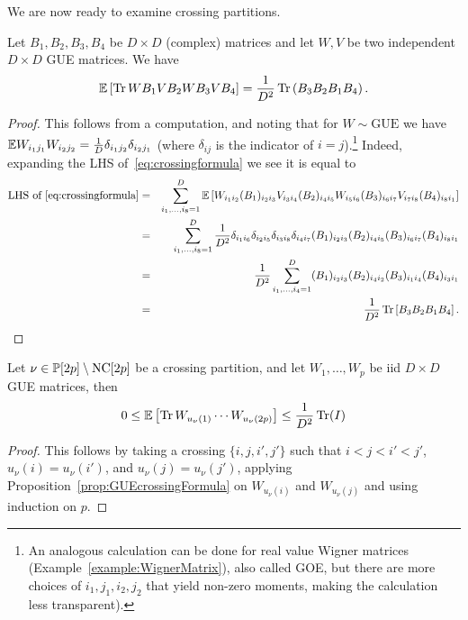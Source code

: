 We are now ready to examine crossing partitions.

\begin{proposition}\label{prop:GUEcrossingFormula}
Let $B_1,B_2,B_3,B_4$ be $D\times D$ (complex) matrices and let $W,V$ be two independent $D\times D$ GUE matrices. We have
\begin{equation}\label{eq:crossingformula}
\mathbb{E}\left[ \operatorname{Tr} W B_1 V B_2 W B_3 V B_4 \right] = \frac{1}{D^2} \operatorname{Tr}\left( B_3B_2B_1B_4 \right).
\end{equation}
\end{proposition}
\begin{proof}
This follows from a computation, and noting that for $W\sim\mathrm{GUE}$ we have $
\mathbb{E} W_{i_1j_1}W_{i_2j_2} = \frac1{D}\delta_{i_1j_2}\delta_{i_2j_1}$ (where $\delta_{ij}$ is the indicator of $i=j$).\footnote{An analogous  calculation can be done for real value Wigner matrices (Example~\ref{example:WignerMatrix}), also called GOE, but there are more choices of $i_1,j_1,i_2,j_2$ that yield non-zero moments, making the calculation less transparent).} Indeed, expanding the LHS of~\eqref{eq:crossingformula} we see it is equal to
\begin{eqnarray*}
\mathrm{LHS}\text{ of }\eqref{eq:crossingformula} & = & \sum_{i_1,\dots,i_8=1}^D \mathbb{E}\left[W_{i_1i_2} (B_1)_{i_2i_3} V_{i_3i_4} (B_2)_{i_4i_5} W_{i_5i_6} (B_3)_{i_6i_7} V_{i_7i_8} (B_4)_{i_8i_1} \right] \\ 
& = & \sum_{i_1,\dots,i_8=1}^D \frac1{D^2}\delta_{i_1i_6}\delta_{i_2i_5}\delta_{i_3i_8}\delta_{i_4i_7}  (B_1)_{i_2i_3}  (B_2)_{i_4i_5}  (B_3)_{i_6i_7}  (B_4)_{i_8i_1} \\
& = & \frac1{D^2}\sum_{i_1,\dots,i_4=1}^D  (B_1)_{i_2i_3}  (B_2)_{i_4i_2}  (B_3)_{i_1i_4}  (B_4)_{i_3i_1} \\
& = & \frac1{D^2}\operatorname{Tr}\left[ B_3 B_2 B_1 B_4\right].
\end{eqnarray*}
\end{proof}


\begin{proposition}\label{prop:GUEcrossingpairings}
 Let $\nu\in\mathbb{P}[2p]\setminus\mathrm{NC}[2p]$ be a crossing partition, and let $W_1,\dots,W_{p}$ be iid $D\times D$ GUE matrices, then
\begin{equation}
    0\leq \mathbb{E}\left[\operatorname{Tr} W_{u_\nu(1)}\cdots W_{u_\nu(2p)}\right] \leq \frac1{D^2}\operatorname{Tr}(I)
\end{equation}
\end{proposition}
\begin{proof}
This follows by taking a crossing $\{i,j,i',j'\}$ such that $i<j<i'<j'$,  $u_\nu(i)=u_\nu(i')$, and $u_\nu(j)=u_\nu(j')$, applying Proposition~\ref{prop:GUEcrossingFormula} on $W_{u_\nu(i)}$ and $W_{u_\nu(j)}$ and using induction on $p$.
\end{proof}

